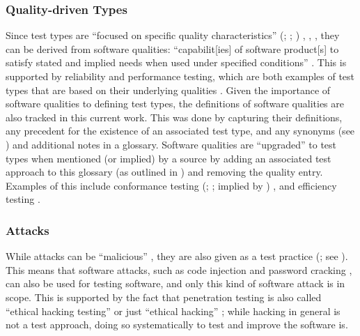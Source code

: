     \subsubsection{Quality-driven Types}
    \label{qual-test}

    Since test types are ``focused on specific quality characteristics''
    \ifnotpaper
        (\citealp[p.~15]{IEEE2022}; \citeyear[p.~7]{IEEE2021};
        \citeyear[p.~473]{IEEE2017})%
    \else
        \cite[p.~15]{IEEE2022}, \cite[p.~7]{IEEE2021}, \cite[p.~473]{IEEE2017}%
    \fi, they can be derived from software qualities: ``capabilit[ies] of
    software product[s] to satisfy stated and implied needs when used under
    specified conditions'' \citep[p.~424]{IEEE2017}. This
    is supported by reliability and performance testing, which are both examples of
    test types \citep{IEEE2022, IEEE2021} that are based on their underlying
    qualities \citep[p.~18]{FentonAndPfleeger1997}.
    Given the importance of software qualities to defining test types, the
    definitions of \qualityCount{} software qualities are also tracked in this
    current work. This was done by capturing their
    definitions, any precedent for the existence of an associated test type,
    and any synonyms (see ) and additional notes in a glossary.
    Software qualities are ``upgraded'' to test types when mentioned (or
    implied) by a source by adding an associated test approach to this glossary
    (as outlined in ) and removing the quality entry. Examples
    of this include conformance testing
    \ifnotpaper
        (\citealp[p.~5-7]{SWEBOK2024}; \citealp[p.~25]{JardEtAl1999}; implied
        by \citealp[p.~93]{IEEE2017})
    \else
        \cite[p.~5-7]{SWEBOK2024}, \cite[p.~25]{JardEtAl1999}
    \fi and efficiency testing \citep[p.~44]{Kam2008}.

    \subsubsection{Attacks}
    \label{attacks}
    While attacks can be ``malicious'' \citep[p.~7]{IEEE2017}, they are also
    given as a test practice (\citeyear[p.~34]{IEEE2022}; see ).
    This means that software attacks, such as code injection and password
    cracking \citepISTQB{}, can also be used for testing software, and only
    this kind of software attack is in scope. This is supported by the fact
    that penetration testing is also called ``ethical hacking testing''
    \citep[p.~13-4]{SWEBOK2024} or just ``ethical hacking''
    \citep[p.~28]{Gerrard2000b}; while hacking in general is not a test
    approach, doing so systematically to test and improve the software is.

